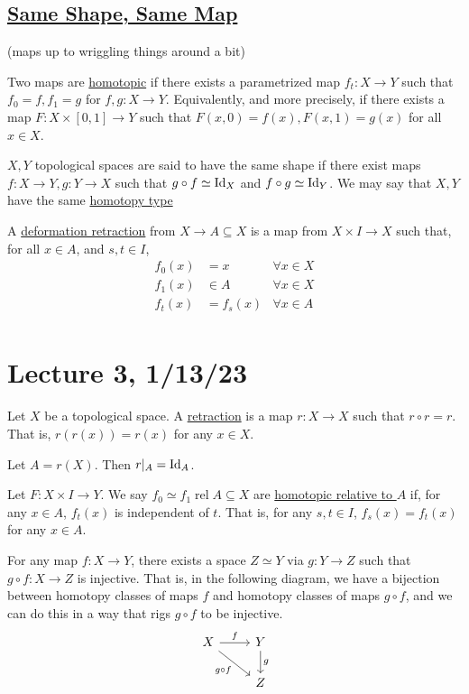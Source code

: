 \documentclass[x11names,reqno,14pt]{extarticle}
\DeclareMathOperator{\rel}{rel}
\begin{document}
\subsection*{\underline{Same Shape, Same Map}}
(maps up to wriggling things around a bit)

 Two maps are \underline{homotopic} if there exists a parametrized map $f_t:X\to Y$ such that $f_0 = f, f_1 = g$ for $f, g:X \to Y$. Equivalently, and more precisely, if there exists a map $F:X\times[0,1]\to Y$ such that $F(x, 0) = f(x), F(x, 1) = g(x)$ for all $x \in X$. 

$X, Y$ topological spaces are said to have the same shape if there exist maps $f:X\to Y, g:Y\to X$ such that $g\circ f\simeq \operatorname{\mathrm{Id}}_X$ and $f\circ g \simeq \operatorname{\mathrm{Id}}_Y$. We may say that $X, Y$ have the same \underline{homotopy type}


A \underline{deformation retraction} from $X \to A\subseteq X$ is a map from $X \times I \to X$ such that, for all $x \in A$, and $s, t \in I$,
\begin{align*}
f_0(x) &= x&\forall x \in X \\
f_1(x) &\in A&\forall x \in X \\
f_t(x) &= f_s(x)& \forall x \in A \\
\end{align*}

\section*{Lecture 3, 1/13/23}


Let $X$ be a topological space. A \underline{retraction} is a map $r:X\to X$ such that $r \circ r = r$. That is, $r(r(x)) = r(x)$ for any $x \in X$. 

Let $A = r(X)$. Then $r|_A = \operatorname{\mathrm{Id}}_A$. 


Let $F:X\times I\to Y$. We say $f_0 \simeq f_1 \rel A\subseteq X$ are \underline{homotopic relative to $A$} if, for any $x \in A$, $f_t(x)$ is independent of $t$. That is, for any $s, t \in I$, $f_s(x) = f_t(x)$ for any $x \in A$. 


For any map $f:X\to Y$, there exists a space $Z \simeq Y$ via $g:Y \to Z$ such that $g \circ f:X\to Z$ is injective. That is, in the following diagram, we have a bijection between homotopy classes of maps $f$ and homotopy classes of maps $g\circ f$, and we can do this in a way that rigs $g \circ f$ to be injective. 
\[
\begin{tikzcd}
X \ar[r, "f"] \ar[rd, "g\circ f"'] & Y \ar[d, "g"] \\
& Z \\
\end{tikzcd}
\]
\end{document}
